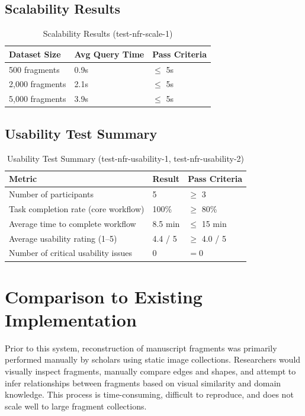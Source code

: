 \documentclass[12pt, titlepage]{article}
\begin{document}
\subsection{Scalability Results}

\begin{table}[H]
\centering
\caption{Scalability Results (test-nfr-scale-1)}
\label{tab:scale-bench}
\begin{tabularx}{\textwidth}{p{4.0cm}p{4.4cm}p{4.8cm}}
\toprule
\textbf{Dataset Size} & \textbf{Avg Query Time} & \textbf{Pass Criteria}\\
\midrule
500 fragments & 0.9s & $\leq$ 5s\\
2,000 fragments & 2.1s & $\leq$ 5s\\
5,000 fragments & 3.9s & $\leq$ 5s\\
\bottomrule
\end{tabularx}
\end{table}

\subsection{Usability Test Summary}

\begin{table}[H]
\centering
\caption{Usability Test Summary (test-nfr-usability-1, test-nfr-usability-2)}
\label{tab:usability-summary}
\begin{tabularx}{\textwidth}{p{4.6cm}p{4.2cm}p{5.0cm}}
\toprule
\textbf{Metric} & \textbf{Result} & \textbf{Pass Criteria}\\
\midrule
Number of participants & 5 & $\geq$ 3\\
Task completion rate (core workflow) & 100\% & $\geq$ 80\%\\
Average time to complete workflow & 8.5 min & $\leq$ 15 min\\
Average usability rating (1--5) & 4.4 / 5 & $\geq$ 4.0 / 5\\
Number of critical usability issues & 0 & $= 0$\\
\bottomrule
\end{tabularx}
\end{table}

\section{Comparison to Existing Implementation}

Prior to this system, reconstruction of manuscript fragments was primarily performed manually by scholars using static image collections. Researchers would visually inspect fragments, manually compare edges and shapes, and attempt to infer relationships between fragments based on visual similarity and domain knowledge. This process is time-consuming, difficult to reproduce, and does not scale well to large fragment collections.
\end{document}
